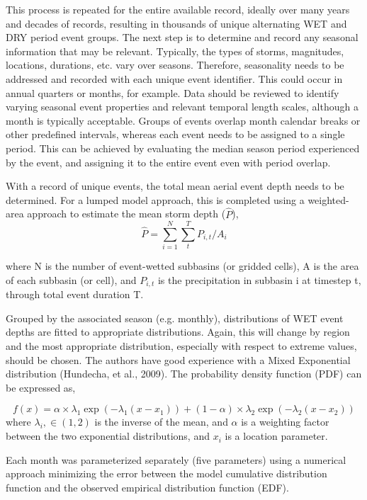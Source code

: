 \documentclass[11pt]{article} %
\begin{document}
This process is repeated for the entire available record, ideally over many years and decades of records, resulting in thousands of unique alternating WET and DRY period event groups. The next step is to determine and record any seasonal information that may be relevant. Typically, the types of storms, magnitudes, locations, durations, etc. vary over seasons. Therefore, seasonality needs to be addressed and recorded with each unique event identifier. This could occur in annual quarters or months, for example. Data should be reviewed to identify varying seasonal event properties and relevant temporal length scales, although a month is typically acceptable. Groups of events overlap month calendar breaks or other predefined intervals, whereas each event needs to be assigned to a single period. This can be achieved by evaluating the median season period experienced by the event, and assigning it to the entire event even with period overlap.

With a record of unique events, the total mean aerial event depth needs to be determined. For a lumped model approach, this is completed using a weighted-area approach to estimate the mean storm depth ($\hat P$),
\begin{equation}
\hat P=\sum_{i=1}^{N}\sum_t^T P_{i,t}/A_i
\end{equation}

where N is the number of event-wetted subbasins (or gridded cells), A is the area of each subbasin (or cell), and $P_{i,t}$ is the precipitation in subbasin i at timestep t, through total event duration T. 

Grouped by the associated season (e.g. monthly), distributions of WET event depths are fitted to appropriate distributions. Again, this will change by region and the most appropriate distribution, especially with respect to extreme values, should be chosen. The authors have good experience with a Mixed Exponential distribution (Hundecha, et al., 2009). The probability density function (PDF) can be expressed as,

\begin{equation}
f(x)=\alpha\times\lambda_1 \exp(-\lambda_1 (x-x_1))+(1-\alpha)\times\lambda_2 \exp(-\lambda_2 (x-x_2))
\end{equation}
where $\lambda_i ,\in(1,2)$ is the inverse of the mean, and $\alpha$ is a weighting factor between the two exponential distributions, and $x_i$ is a location parameter.

Each month was parameterized separately (five parameters) using a numerical approach minimizing the error between the model cumulative distribution function and the observed empirical distribution function (EDF). 
\end{document}
